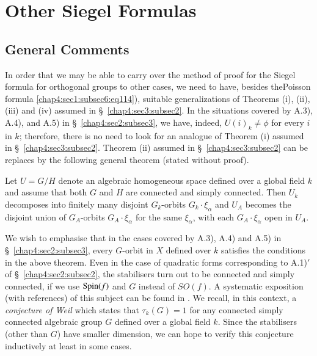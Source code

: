 \section{Other Siegel Formulas}\label{chap4:sec4}%

\subsection{General Comments}\label{chap4:sec4:subsec1} %

In order that we may be able to carry over the method of proof for the
Siegel formula for orthogonal groups to other cases, we need to have,
besides the\pageoriginale Poisson formula
\ref{chap4:sec1:subsec6:eq114}), suitable 
generalizations of Theorems (i), (ii), (iii) and (iv) assumed in
\S\ \ref{chap4:sec3:subsec2}. In the situations covered by A.3), A.4),
and A.5) in 
\S\ \ref{chap4:sec2:subsec3}, we have, indeed, $U(i)_{k}\neq \phi$ for
every $i$ in 
$k$; therefore, there is no need to look for an analogue of Theorem
(i) assumed in \S\ \ref{chap4:sec3:subsec2}. Theorem (ii) assumed in
\S\ \ref{chap4:sec3:subsec2} 
can be replaces by the following general theorem (stated without
proof).

\begin{theorem}\label{chap4:sec4:subsec1:thm1} %
  Let $U=G/H$ denote an algebraic homogeneous space defined over a
  global field $k$ and assume that both $G$ and $H$ are connected and
  simply connected. Then $U_{k}$ decomposes into finitely many disjoint
  $G_{k}$-orbits $G_{k}\cdot \xi_{\alpha}$ and $U_{A}$ becomes the
  disjoint union of $G_{A}$-orbits $G_{A}\cdot \xi_{\alpha}$ for the
  same $\xi_{\alpha}$, with each $G_{A}\cdot \xi_{\alpha}$ open in $U_{A}$.
\end{theorem}

We wish to emphasise that in the cases covered by A.3), A.4) and A.5)
in \S\ \ref{chap4:sec2:subsec3}, every $G$-orbit in $X$ defined over
$k$ satisfies 
the conditions in the above theorem. Even in the case of quadratic
forms corresponding to A.1)$'$ of \S\ \ref{chap4:sec2:subsec2}, the
stabilisers turn 
out to be connected and simply connected, if we use $\operatorname{Spin}(f)$ and $G$
instead of $SO(f)$. A systematic exposition (with references) of this
subject can be found in \cite{Igu 2}. We recall, in this context, a {\em
  conjecture of Weil} which states that $\tau_{k}(G)=1$ for any
connected simply connected algebraic group $G$ defined over a global
field $k$. Since the stabilisers (other than $G$) have smaller
dimension, we can hope to verify this conjecture inductively at least
in some cases.

